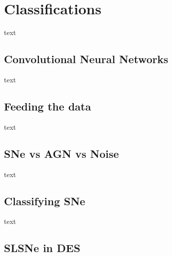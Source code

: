 \section{Classifications} \label{sec:CNN}
text
\subsection{Convolutional Neural Networks}
text
\subsection{Feeding the data}
text
\subsection{SNe vs AGN vs Noise}
text
\subsection{Classifying SNe}
text
\subsection{SLSNe in DES}

